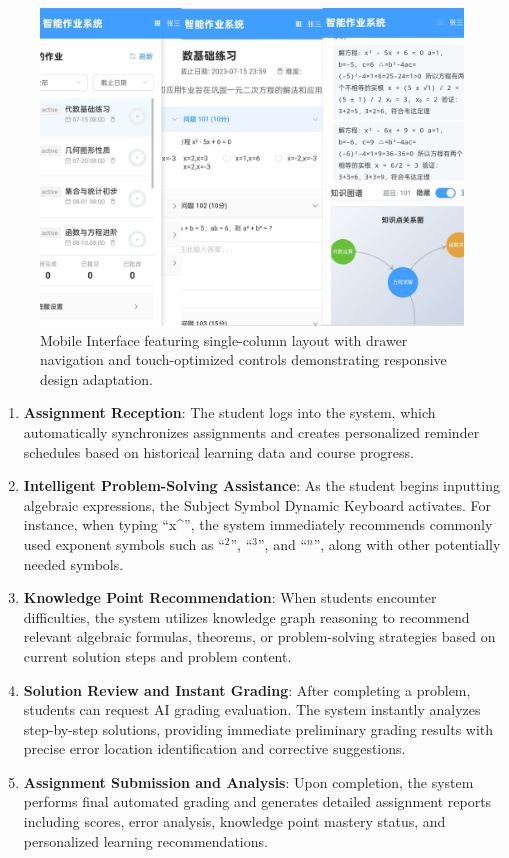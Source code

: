 \documentclass[conference]{IEEEtran}
\begin{document}
\begin{figure}[htbp]
\centerline{\includegraphics[width=\columnwidth]{5c.png}}
\caption{Mobile Interface featuring single-column layout with drawer navigation and touch-optimized controls demonstrating responsive design adaptation.}
\label{fig:mobile}
\end{figure}

\begin{enumerate}
\item \textbf{Assignment Reception}: The student logs into the system, which automatically synchronizes assignments and creates personalized reminder schedules based on historical learning data and course progress.

\item \textbf{Intelligent Problem-Solving Assistance}: As the student begins inputting algebraic expressions, the Subject Symbol Dynamic Keyboard activates. For instance, when typing ``x\^{}'', the system immediately recommends commonly used exponent symbols such as ``$^2$'', ``$^3$'', and ``$^n$'', along with other potentially needed symbols.

\item \textbf{Knowledge Point Recommendation}: When students encounter difficulties, the system utilizes knowledge graph reasoning to recommend relevant algebraic formulas, theorems, or problem-solving strategies based on current solution steps and problem content.

\item \textbf{Solution Review and Instant Grading}: After completing a problem, students can request AI grading evaluation. The system instantly analyzes step-by-step solutions, providing immediate preliminary grading results with precise error location identification and corrective suggestions.

\item \textbf{Assignment Submission and Analysis}: Upon completion, the system performs final automated grading and generates detailed assignment reports including scores, error analysis, knowledge point mastery status, and personalized learning recommendations.
\end{enumerate}
\end{document}
